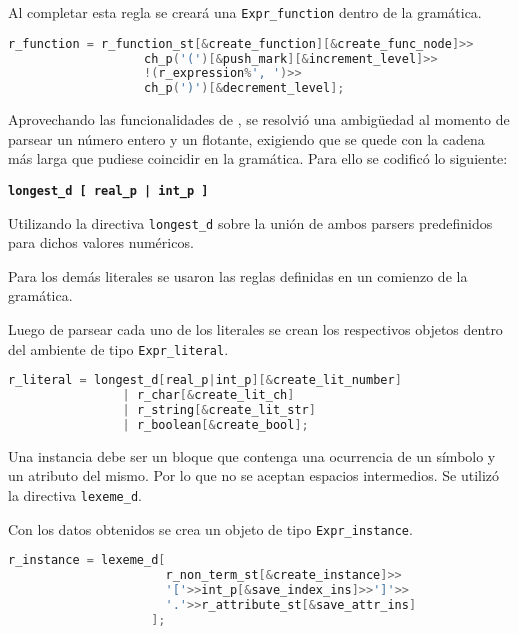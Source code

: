 Al completar esta regla se creará una \texttt{Expr\_function} dentro de la gramática.

\begin{lstlisting}[float=!ht, language=C++, basicstyle=\scriptsize, columns=fullflexible, linewidth=11cm]
r_function = r_function_st[&create_function][&create_func_node]>>
                   ch_p('(')[&push_mark][&increment_level]>>
                   !(r_expression%', ')>>
                   ch_p(')')[&decrement_level];
\end{lstlisting}

Aprovechando las funcionalidades de \spirit, se resolvió una ambigüedad al momento de parsear un número entero y un flotante, exigiendo que se quede con la cadena más larga que pudiese coincidir en la gramática. Para ello se codificó lo siguiente:

\begin{center}\textbf{\large{\texttt{longest\_d\ [\ real\_p\ |\ int\_p\ ]}}}\end{center}

Utilizando la directiva \texttt{longest\_d} sobre la unión de ambos parsers predefinidos para dichos valores numéricos.

Para los demás literales se usaron las reglas definidas en un comienzo de la gramática.

Luego de parsear cada uno de los literales se crean los respectivos objetos dentro del ambiente de tipo \texttt{Expr\_literal}.

\begin{lstlisting}[language=C++, basicstyle=\scriptsize, columns=fullflexible, linewidth=9cm]
r_literal = longest_d[real_p|int_p][&create_lit_number]
                | r_char[&create_lit_ch]
                | r_string[&create_lit_str]
                | r_boolean[&create_bool];
\end{lstlisting}

Una instancia debe ser un bloque que contenga una ocurrencia de un símbolo y un atributo del mismo. Por lo que no se aceptan espacios intermedios. Se utilizó la directiva \texttt{lexeme\_d}.

Con los datos obtenidos se crea un objeto de tipo \texttt{Expr\_instance}.

\begin{lstlisting}[language=C++, basicstyle=\scriptsize, columns=fullflexible, linewidth=9cm]
r_instance = lexeme_d[
                      r_non_term_st[&create_instance]>>
                      '['>>int_p[&save_index_ins]>>']'>>
                      '.'>>r_attribute_st[&save_attr_ins]
                    ];
\end{lstlisting}


